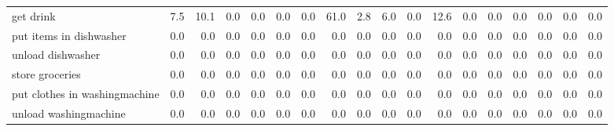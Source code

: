 \documentclass{article}
\begin{document}
\begin{sideways}
\begin{tabular}{lrrrrrrrrrrrrrrrrr}
get drink                     &         7.5 &               10.1 &           0.0 &               0.0 &                0.0 &                0.0 &             61.0 &                      2.8 &                   6.0 &              0.0 &             12.6 &                            0.0 &                      0.0 &                    0.0 &                                  0.0 &                          0.0 &                  0.0 \\
put items in dishwasher       &         0.0 &                0.0 &           0.0 &               0.0 &                0.0 &                0.0 &              0.0 &                      0.0 &                   0.0 &              0.0 &              0.0 &                            0.0 &                      0.0 &                    0.0 &                                  0.0 &                          0.0 &                  0.0 \\
unload dishwasher             &         0.0 &                0.0 &           0.0 &               0.0 &                0.0 &                0.0 &              0.0 &                      0.0 &                   0.0 &              0.0 &              0.0 &                            0.0 &                      0.0 &                    0.0 &                                  0.0 &                          0.0 &                  0.0 \\
store groceries               &         0.0 &                0.0 &           0.0 &               0.0 &                0.0 &                0.0 &              0.0 &                      0.0 &                   0.0 &              0.0 &              0.0 &                            0.0 &                      0.0 &                    0.0 &                                  0.0 &                          0.0 &                  0.0 \\
put clothes in washingmachine &         0.0 &                0.0 &           0.0 &               0.0 &                0.0 &                0.0 &              0.0 &                      0.0 &                   0.0 &              0.0 &              0.0 &                            0.0 &                      0.0 &                    0.0 &                                  0.0 &                          0.0 &                  0.0 \\
unload washingmachine         &         0.0 &                0.0 &           0.0 &               0.0 &                0.0 &                0.0 &              0.0 &                      0.0 &                   0.0 &              0.0 &              0.0 &                            0.0 &                      0.0 &                    0.0 &                                  0.0 &                          0.0 &                  0.0 \\

\end{tabular}
\end{sideways}
\end{document}
